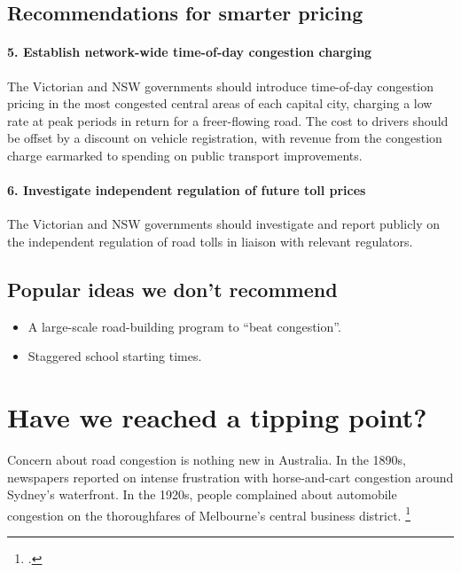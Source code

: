 \documentclass{grattan}
\begin{document}
\begin{recommendations}
\section*{Recommendations for smarter pricing}


\subsubsection{5. Establish network-wide time-of-day congestion charging}
The Victorian and NSW governments should introduce time-of-day congestion pricing in the most congested central areas of each capital city, charging a low rate at peak periods in return for a freer-flowing road.
The cost to drivers should be offset by a discount on vehicle registration, with revenue from the congestion charge earmarked to spending on public transport improvements.
\subsubsection{6. Investigate independent regulation of future toll prices}
The Victorian and NSW governments should investigate and report publicly on the independent regulation of road tolls in liaison with relevant regulators.


\section*{Popular ideas we don’t recommend}

\begin{itemize}
\item A large-scale road-building program to ``beat congestion''.
\item Staggered school starting times.
\end{itemize}

\end{recommendations}





\contentspage
\listoffigures


\chapter{Have we reached a tipping point?}\label{chap:has-congestion-reached-tipping-point}

Concern about road congestion is nothing new in Australia.
In the 1890s, newspapers reported on intense frustration with horse-and-cart congestion around Sydney's waterfront.
In the 1920s, people complained about automobile congestion on the thoroughfares of Melbourne's central business district.%
    \footcite[][165]{Davison-2016-City-Dreamers}
\end{document}
